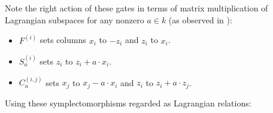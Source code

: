 Note the right action of these gates in terms of matrix multiplication of Lagrangian subspaces for any nonzero $a \in k$ (as observed in \cite[page 4]{aaronson}):
\begin{itemize}
\item
$F^{(i)}$ sets columns $x_i$ to $-z_i$ and $z_i$ to $x_i$.
\item
$S_a^{(i)}$ sets $z_i$ to $z_i+a\cdot x_i$.
\item
$C_a^{(i,j)}$ sets $x_j$ to $x_j- a \cdot x_i$ and $z_i$ to $z_i+a\cdot z_j$.
\end{itemize}
Using these symplectomorphisms regarded as Lagrangian relations:
%
%
%
%
%
%
